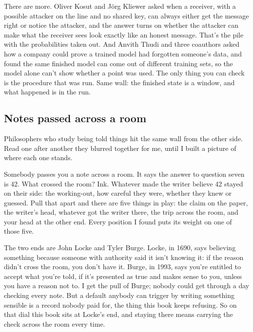 \documentclass[11pt,twoside]{article}
\theoremstyle{thielethm}
\theoremstyle{thieledef}
\theoremstyle{thieledef}
\theoremstyle{thieledef}
\theoremstyle{thielethm}
\theoremstyle{thieleobs}
\theoremstyle{thielethm}
\begin{document}
There are more. Oliver Kosut and Jörg Kliewer asked when a receiver, with a possible attacker on the line and no shared key, can always either get the message right or notice the attacker, and the answer turns on whether the attacker can make what the receiver sees look exactly like an honest message. That's the pile with the probabilities taken out. And Anvith Thudi and three coauthors asked how a company could prove a trained model had forgotten someone's data, and found the same finished model can come out of different training sets, so the model alone can't show whether a point was used. The only thing you can check is the procedure that was run. Same wall: the finished state is a window, and what happened is in the run.

\subsection{Notes passed across a room}

Philosophers who study being told things hit the same wall from the other side. Read one after another they blurred together for me, until I built a picture of where each one stands.

Somebody passes you a note across a room. It says the answer to question seven is 42. What crossed the room? Ink. Whatever made the writer believe 42 stayed on their side: the working-out, how careful they were, whether they knew or guessed. Pull that apart and there are five things in play: the claim on the paper, the writer's head, whatever got the writer there, the trip across the room, and your head at the other end. Every position I found puts its weight on one of those five.

The two ends are John Locke and Tyler Burge. Locke, in 1690, says believing something because someone with authority said it isn't knowing it: if the reason didn't cross the room, you don't have it. Burge, in 1993, says you're entitled to accept what you're told, if it's presented as true and makes sense to you, unless you have a reason not to. I get the pull of Burge; nobody could get through a day checking every note. But a default anybody can trigger by writing something sensible is a record nobody paid for, the thing this book keeps refusing. So on that dial this book sits at Locke's end, and staying there means carrying the check across the room every time.
\end{document}
